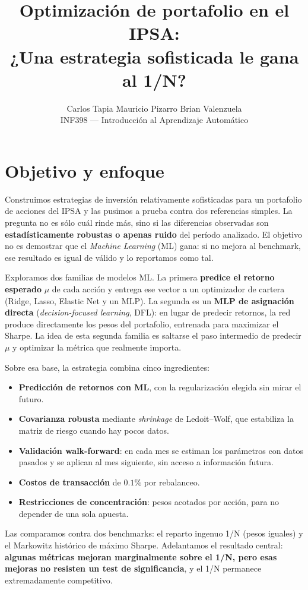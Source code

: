\documentclass[11pt]{article}
\title{\vspace{-1.2cm}\textbf{Optimización de portafolio en el IPSA:\\
¿Una estrategia sofisticada le gana al 1/N?}}
\author{Carlos Tapia \quad Mauricio Pizarro \quad Brian Valenzuela\\[2pt]
\small INF398 --- Introducción al Aprendizaje Automático}
\begin{document}
\maketitle
\vspace{-0.6cm}

\section{Objetivo y enfoque}
Construimos estrategias de inversión relativamente sofisticadas para un portafolio de acciones del
IPSA y las pusimos a prueba contra dos referencias simples. La pregunta no es sólo cuál rinde más,
sino si las diferencias observadas son \textbf{estadísticamente robustas o apenas ruido} del período
analizado. El objetivo no es demostrar que el \emph{Machine Learning} (ML) gana: si no mejora al
benchmark, ese resultado es igual de válido y lo reportamos como tal.

Exploramos dos familias de modelos ML. La primera \textbf{predice el retorno esperado} $\mu$ de cada
acción y entrega ese vector a un optimizador de cartera (Ridge, Lasso, Elastic Net y un MLP). La
segunda es un \textbf{MLP de asignación directa} (\emph{decision-focused learning}, DFL): en lugar de
predecir retornos, la red produce directamente los pesos del portafolio, entrenada para maximizar el
Sharpe. La idea de esta segunda familia es saltarse el paso intermedio de predecir $\mu$ y optimizar
la métrica que realmente importa.

Sobre esa base, la estrategia combina cinco ingredientes:
\begin{itemize}[nosep,leftmargin=*]
  \item \textbf{Predicción de retornos con ML}, con la regularización elegida sin mirar el futuro.
  \item \textbf{Covarianza robusta} mediante \emph{shrinkage} de Ledoit--Wolf, que estabiliza la
  matriz de riesgo cuando hay pocos datos.
  \item \textbf{Validación walk-forward}: en cada mes se estiman los parámetros con datos pasados y se
  aplican al mes siguiente, sin acceso a información futura.
  \item \textbf{Costos de transacción} de $0.1\%$ por rebalanceo.
  \item \textbf{Restricciones de concentración}: pesos acotados por acción, para no depender de una
  sola apuesta.
\end{itemize}

Las comparamos contra dos benchmarks: el reparto ingenuo 1/N (pesos iguales) y el Markowitz histórico
de máximo Sharpe. Adelantamos el resultado central: \textbf{algunas métricas mejoran marginalmente
sobre el 1/N, pero esas mejoras no resisten un test de significancia}, y el 1/N permanece
extremadamente competitivo.
\end{document}
